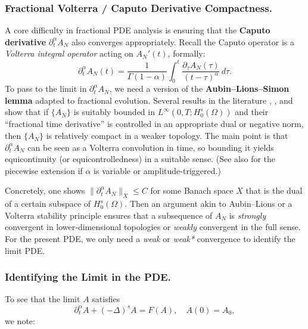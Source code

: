 \documentclass[12pt]{article}
\begin{document}
\subsubsection{Fractional Volterra / Caputo Derivative Compactness.}
A core difficulty in fractional PDE analysis is ensuring that the \textbf{Caputo derivative}
\(\partial_t^\alpha A_N\) also converges appropriately.  Recall the Caputo operator is a
\emph{Volterra integral operator} acting on \(A_N'(t)\), formally:
\[
\partial_t^\alpha A_N(t)
=
\frac{1}{\Gamma(1-\alpha)}
\int_0^t
  \frac{\partial_\tau A_N(\tau)}{(t-\tau)^\alpha}\,d\tau.
\]
To pass to the limit in \(\partial_t^\alpha A_N\), we need a version of
the \textbf{Aubin–Lions–Simon lemma} adapted to fractional evolution.  Several results in
the literature \cite[Ch.~4]{Diethelm2010}, \cite[Section~4.1]{Kilbas2006}, and
\cite{Simon1987} show that if \(\{A_N\}\) is suitably bounded in
\(L^\infty(0,T;H_0^s(\Omega))\) and their “fractional time derivative” is controlled
in an appropriate dual or negative norm, then \(\{A_N\}\) is relatively compact in a
weaker topology.  The main point is that \(\partial_t^\alpha A_N\) can be seen as a
Volterra convolution in time, so bounding it yields equicontinuity (or equicontrolledness)
in a suitable sense.  (See also \cite{Sun2019} for the piecewise extension if \(\alpha\)
is variable or amplitude‐triggered.)

Concretely, one shows \(\|\partial_t^\alpha A_N\|_{X}\le C\) for some Banach space \(X\)
that is the dual of a certain subspace of \(H_0^s(\Omega)\).  Then an argument akin to
Aubin–Lions or a Volterra stability principle ensures that a subsequence of \(A_N\)
is \emph{strongly} convergent in lower‐dimensional topologies or \emph{weakly} convergent
in the full sense.  For the present PDE, we only need a \emph{weak} or \emph{weak*}
convergence to identify the limit PDE.

\subsubsection{Identifying the Limit in the PDE.}
To see that the limit \(A\) satisfies
\[
\partial_t^\alpha A + (-\Delta)^s A = F(A),
\quad
A(0)=A_0,
\]
we note:
\end{document}
